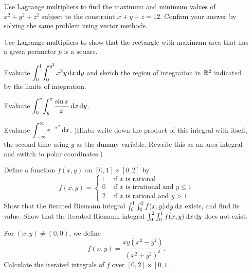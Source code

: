 \documentclass{watsonbook}
\begin{document}
\begin{aexercise}
  Use Lagrange multipliers to find the maximum and minimum values of
  $x^2 + y^2 + z^2$ subject to the constraint $x + y + z =
  12$. Confirm your answer by solving the same problem using vector
  methods.
\end{aexercise}

\begin{aexercise}
  Use Lagrange multipliers to show that the rectangle with maximum
  area that has a given perimeter $p$ is a square.
\end{aexercise}


\begin{aexercise}
  Evaluate
  $\displaystyle{\int_{0}^{1}\!\int_{0}^{y^2} x^2 y \,\mathrm{d}x\,\mathrm{d}y}$ and
  sketch the region of integration in $\mathbb{R}^2$ indicated by the limits
  of integration.
\end{aexercise}

\begin{aexercise}
  Evaluate $\displaystyle{\int_{0}^\pi \!\int_{y}^{\pi}\frac{\sin x}{x} \,\mathrm{d}x\,\mathrm{d}y}$.
\end{aexercise}

\begin{aexercise}%
  Evaluate $\displaystyle{\int_{-\infty}^{\infty} \mathrm{e}^{-x^2}\,\mathrm{d}x}$. (Hints: write down
  the product of this integral with itself, the second time using $y$
  as the dummy variable. Rewrite this as an area integral and switch
  to polar coordinates.)
\end{aexercise}

\begin{aexercise}%
  Define a function $f(x,y)$ on $[0,1] \times [0,2]$ by
  \[
    f(x,y) = \left\{
      \begin{array}{cl}
        1 & \text{ if }x\text{ is rational} \\
        0 & \text{ if }x\text{ is irrational and }y \leq 1 \\
        2 & \text{ if }x\text{ is rational and }y > 1.
      \end{array} 
    \right.
  \]
  Show that the iterated Riemann integral
  $\int_0^1\int_0^2 f(x,y)\,\mathrm{d} y\,\mathrm{d} x$ exists, and find
  its value. Show that the iterated Riemann integral
  $\int_0^2\int_0^1 f(x,y)\,\mathrm{d} x\,\mathrm{d} y$ does not exist.
\end{aexercise}

\begin{aexercise}
  For $(x,y) \neq (0,0)$, we define
  \[
    f(x,y) = \frac{xy(x^2-y^2)}{(x^2+y^2)^3}.
  \]
  Calculate the iterated integrals of $f$ over $[0,2]\times[0,1]$.
\end{aexercise}
\end{document}
